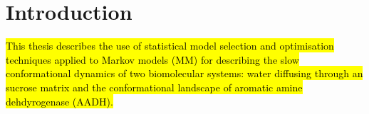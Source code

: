 %
%
\let\textcircled=\pgftextcircled
\chapter{Introduction}
\label{chap:intro}

\hl{This thesis describes the use of statistical model selection and optimisation techniques applied to Markov models (MM) for describing the slow conformational dynamics of two biomolecular systems: water diffusing through an sucrose matrix and the conformational landscape of aromatic amine dehdyrogenase (AADH).}


